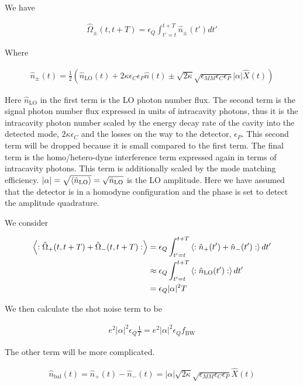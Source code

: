 \documentclass[12pt]{article}
\begin{document}
We have

\begin{align}
\hat{\Omega}_{\pm}(t,t+T) = \epsilon_Q\int_{t'=t}^{t+T} \hat{n}_{\pm}(t')dt'
\end{align}

Where

\begin{align}
\hat{n}_{\pm}(t) = \frac{1}{2}\left(\hat{n}_{\text{LO}}(t) + 2\kappa \epsilon_{C}\epsilon_P \hat{n}(t) \pm \sqrt{2\kappa} \sqrt{\epsilon_{MM}\epsilon_C\epsilon_P}|\alpha|\hat{X}(t) \right)
\end{align}

Here $\hat{n}_{\text{LO}}$ in the first term is the LO photon number flux. The second term is the signal photon number flux expressed in units of intracavity photons, thus it is the intracavity photon number scaled by the energy decay rate of the cavity into the detected mode, $2\kappa \epsilon_C$ and the losses on the way to the detector, $\epsilon_P$. This second term will be dropped because it is small compared to the first term. The final term is the homo/hetero-dyne interference term expressed again in terms of intracavity photons. This term is additionally scaled by the mode matching efficiency. $|\alpha| = \sqrt{\braket{\hat{n}_{\text{LO}}}} = \sqrt{\bar{n}_{\text{LO}}}$ is the LO amplitude. Here we have assumed that the detector is in a homodyne configuration and the phase is set to detect the amplitude quadrature.

We consider

\begin{align}
\Braket{:\hat{\Omega}_+(t,t+T) + \hat{\Omega}_-(t,t+T) :} &= \epsilon_Q\int_{t' = t}^{t+T} \Braket{:\hat{n}_+(t') + \hat{n}_-(t'):} dt'\\
&\approx \epsilon_Q\int_{t'=t}^{t+T} \Braket{:\hat{n}_{\text{LO}}(t'):} dt'\\
&= \epsilon_Q |\alpha|^2 T
\end{align}

We then calculate the shot noise term to be

\begin{align}
e^2  |\alpha|^2 \epsilon_Q\frac{1}{T} = e^2 |\alpha|^2\epsilon_Q f_{\text{BW}}
\end{align}

The other term will be more complicated.

\begin{align}
\hat{n}_{\text{bal}}(t) = \hat{n}_+(t) - \hat{n}_-(t) = |\alpha|\sqrt{2\kappa} \sqrt{\epsilon_{MM}\epsilon_C\epsilon_P} \hat{X}(t)
\end{align}
\end{document}
